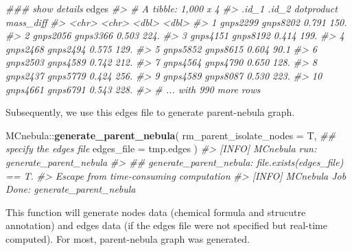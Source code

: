 \documentclass[]{tufte-handout}
\newenvironment{Shaded}{}{}
\newcommand{\CommentTok}[1]{\textcolor[rgb]{0.38,0.63,0.69}{\textit{#1}}}
\newcommand{\DataTypeTok}[1]{\textcolor[rgb]{0.56,0.13,0.00}{#1}}
\newcommand{\KeywordTok}[1]{\textcolor[rgb]{0.00,0.44,0.13}{\textbf{#1}}}
\newcommand{\NormalTok}[1]{#1}
\newcommand{\OperatorTok}[1]{\textcolor[rgb]{0.40,0.40,0.40}{#1}}
\begin{document}
\begin{Shaded}
\begin{Highlighting}[]
\CommentTok{\#\#\# show details}
\NormalTok{edges}
\CommentTok{\#\textgreater{} \# A tibble: 1,000 x 4}
\CommentTok{\#\textgreater{}    .id\_1    .id\_2    dotproduct mass\_diff}
\CommentTok{\#\textgreater{}    \textless{}chr\textgreater{}    \textless{}chr\textgreater{}         \textless{}dbl\textgreater{}     \textless{}dbl\textgreater{}}
\CommentTok{\#\textgreater{}  1 gnps2299 gnps8202      0.791     150. }
\CommentTok{\#\textgreater{}  2 gnps2056 gnps3366      0.503     224. }
\CommentTok{\#\textgreater{}  3 gnps4151 gnps8192      0.414     199. }
\CommentTok{\#\textgreater{}  4 gnps2468 gnps2494      0.575     129. }
\CommentTok{\#\textgreater{}  5 gnps5852 gnps8615      0.604      90.1}
\CommentTok{\#\textgreater{}  6 gnps2503 gnps4589      0.742     212. }
\CommentTok{\#\textgreater{}  7 gnps4564 gnps4790      0.650     128. }
\CommentTok{\#\textgreater{}  8 gnps2437 gnps5779      0.424     256. }
\CommentTok{\#\textgreater{}  9 gnps4589 gnps8087      0.530     223. }
\CommentTok{\#\textgreater{} 10 gnps4661 gnps6791      0.543     228. }
\CommentTok{\#\textgreater{} \# ... with 990 more rows}
\end{Highlighting}
\end{Shaded}

Subsequently, we use this edges file to generate parent-nebula graph.

\begin{Shaded}
\begin{Highlighting}[]
\NormalTok{MCnebula}\OperatorTok{::}\KeywordTok{generate\_parent\_nebula}\NormalTok{(}
  \DataTypeTok{rm\_parent\_isolate\_nodes =}\NormalTok{ T,}
  \CommentTok{\#\# specify the edges file}
  \DataTypeTok{edges\_file =}\NormalTok{ tmp.edges}
\NormalTok{)}
\CommentTok{\#\textgreater{} [INFO] MCnebula run: generate\_parent\_nebula}
\CommentTok{\#\textgreater{} \#\# generate\_parent\_nebula: file.exists(edges\_file) == T.}
\CommentTok{\#\textgreater{} Escape from time{-}consuming computation}
\CommentTok{\#\textgreater{} [INFO] MCnebula Job Done: generate\_parent\_nebula}
\end{Highlighting}
\end{Shaded}

This function will generate nodes data (chemical formula and strucutre
annotation) and edges data (if the edges file were not specified but
real-time computed). For most, parent-nebula graph was generated.
\end{document}
